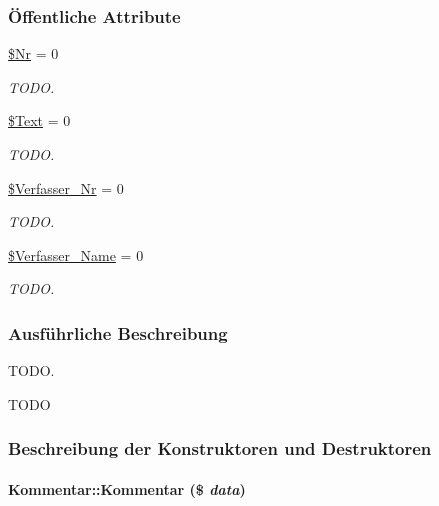 \subsubsection*{\"{O}ffentliche Attribute}
\begin{CompactItemize}
\item 
\hyperlink{classKommentar_1b0a3cfcb9fc7075f985cc8067ab1982}{\$Nr} = 0
\begin{CompactList}\small\item\em TODO. \item\end{CompactList}\item 
\hyperlink{classKommentar_c9a481413d6ba0c000719ad514bad4b5}{\$Text} = 0
\begin{CompactList}\small\item\em TODO. \item\end{CompactList}\item 
\hyperlink{classKommentar_c92b002e40690ee052fec446ff2a0ef6}{\$Verfasser\_\-Nr} = 0
\begin{CompactList}\small\item\em TODO. \item\end{CompactList}\item 
\hyperlink{classKommentar_84f0fc10295968adde28169f8df018d9}{\$Verfasser\_\-Name} = 0
\begin{CompactList}\small\item\em TODO. \item\end{CompactList}\end{CompactItemize}


\subsubsection{Ausf\"{u}hrliche Beschreibung}
TODO. 

TODO 



\subsubsection{Beschreibung der Konstruktoren und Destruktoren}
\hypertarget{classKommentar_ea774e2108c754890c602dfdd53d64e1}{
\paragraph[Kommentar]{\setlength{\rightskip}{0pt plus 5cm}Kommentar::Kommentar (\$ {\em data})}\hfill}
\label{classKommentar_ea774e2108c754890c602dfdd53d64e1}


